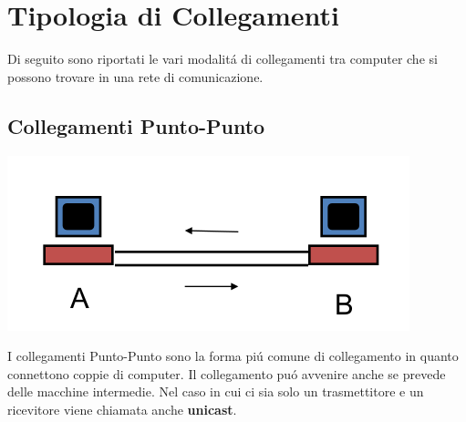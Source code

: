 \documentclass[12pt]{article}
\begin{document}
\clearpage
\section{Tipologia di Collegamenti}\label{tipologia-di-collegamenti}
Di seguito sono riportati le vari modalit\'a di collegamenti tra computer che si possono trovare in una rete di 
comunicazione.

\subsection{Collegamenti Punto-Punto}\label{collegamenti-punto-punto}
\begin{center}
	\includegraphics[scale=0.5]{introduzione-img1.png}
\end{center}
I collegamenti Punto-Punto sono la forma pi\'u comune di collegamento in quanto connettono coppie di computer. Il 
collegamento pu\'o avvenire anche se prevede delle macchine intermedie. Nel caso in cui ci sia solo un trasmettitore e un 
ricevitore viene chiamata anche \textbf{unicast}.
\end{document}
